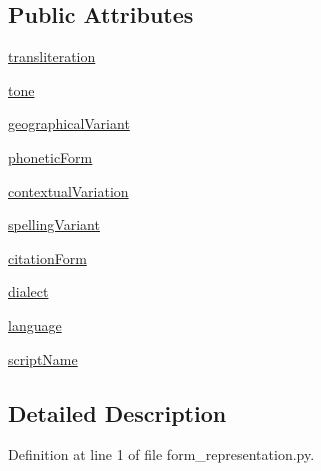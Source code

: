 \subsection*{Public Attributes}
\begin{DoxyCompactItemize}
\item 
\hyperlink{classsrc_1_1morphology_1_1form__representation_1_1_form_representation_ab641b43e576bd4078ca7f590cd00e17e}{transliteration}
\item 
\hyperlink{classsrc_1_1morphology_1_1form__representation_1_1_form_representation_a6562f309df8efc614daec86f8e662205}{tone}
\item 
\hyperlink{classsrc_1_1morphology_1_1form__representation_1_1_form_representation_aca49087a37a117f4766988267d0e9495}{geographical\+Variant}
\item 
\hyperlink{classsrc_1_1morphology_1_1form__representation_1_1_form_representation_a9d2db29441df259d0f273591685a7ce3}{phonetic\+Form}
\item 
\hyperlink{classsrc_1_1morphology_1_1form__representation_1_1_form_representation_a3ee6074cd2caca104319b02c60370acb}{contextual\+Variation}
\item 
\hyperlink{classsrc_1_1morphology_1_1form__representation_1_1_form_representation_a9ccaf68dc63838b47225ab90a5925072}{spelling\+Variant}
\item 
\hyperlink{classsrc_1_1morphology_1_1form__representation_1_1_form_representation_a9caaac05ee08d6575349a8e7813a8e8f}{citation\+Form}
\item 
\hyperlink{classsrc_1_1morphology_1_1form__representation_1_1_form_representation_a79a2634cf8cad98cfbcf12bdd42f3fb3}{dialect}
\item 
\hyperlink{classsrc_1_1morphology_1_1form__representation_1_1_form_representation_a31268b4696f4e0758265e47017da3219}{language}
\item 
\hyperlink{classsrc_1_1morphology_1_1form__representation_1_1_form_representation_a9ac9310c7cd9b88ba07b20453e9e8b62}{script\+Name}
\end{DoxyCompactItemize}


\subsection{Detailed Description}


Definition at line 1 of file form\+\_\+representation.\+py.



